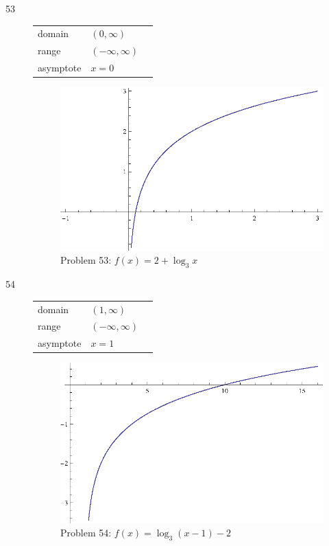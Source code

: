 \documentclass{exam}
\begin{document}
\begin{description}
    \item[53]
      \begin{tabular}[H]{lll}
        \toprule
        domain    & $(0, \infty)$ \\
        range     & $(-\infty, \infty)$ \\
        asymptote & $x = 0$ \\
        \bottomrule
      \end{tabular}

      \begin{figure}[H]
        \centering
        \includegraphics[scale = 0.9]{problem53.eps}
        \caption{Problem 53: $f(x) = 2 + \log_3 x$}
      \end{figure}

    \item[54]
      \begin{tabular}[H]{lll}
        \toprule
        domain    & $(1, \infty)$ \\
        range     & $(-\infty, \infty)$ \\
        asymptote & $x = 1$ \\
        \bottomrule
      \end{tabular}

      \begin{figure}[H]
        \centering
        \includegraphics[scale = 0.9]{problem54.eps}
        \caption{Problem 54: $f(x) = \log_3(x - 1) - 2$}
      \end{figure}


\end{description}
\end{document}
